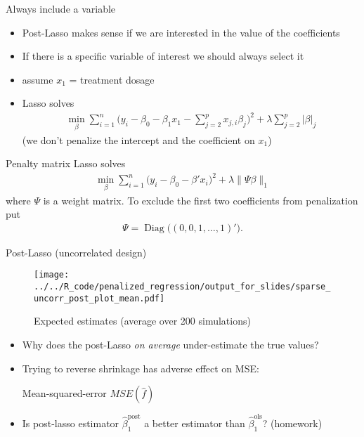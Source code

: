 \documentclass[xcolor=dvipsnames, handout]{beamer}
\DeclareMathOperator{\diag}{Diag}
\begin{document}
\begin{frame}{Always include a variable}
\begin{itemize}[<+->]
  \item Post-Lasso makes sense if we are interested in the value of the coefficients
  \item If there is a specific variable of interest we should always select it
  \item assume $x_1$ = treatment dosage
  \item Lasso solves 
  \begin{align*}
    \min_{\beta} \sum_{i=1}^n \Big(y_i - \beta_0 - \beta_1 x_1 - \sum_{j = 2}^p x_{j, i} \beta_j \Big)^2 + \lambda \sum_{j = 2}^p \lvert\beta\rvert_j   
  \end{align*}
  (we don't penalize the intercept and the coefficient on $x_1$)
\end{itemize}
\end{frame}

\begin{frame}{Penalty matrix}
Lasso solves 
  \begin{align*}
    \min_{\beta} \sum_{i=1}^n \big(y_i - \beta_0 - \beta' x_i \big)^2 + \lambda \lVert \Psi \beta \rVert_1  
  \end{align*}
where $\Psi$ is a weight matrix. To exclude the first two coefficients from penalization put
\begin{align*}
  \Psi = \diag\big((0, 0, 1, \dotsc, 1)'\big).
\end{align*}
\end{frame}

\begin{frame}{Post-Lasso (uncorrelated design)}
\begin{figure}
  \texttt{[image: ../../R\_code/penalized\_regression/output\_for\_slides/sparse\_uncorr\_post\_plot\_mean.pdf]}
   \caption{Expected estimates (average over 200 simulations)}
\end{figure}
\end{frame}

\begin{frame}{}
  
  \begin{itemize}[<+->]
    \item 
    Why does the post-Lasso \emph{on average} under-estimate the true values?
    \item Trying to reverse shrinkage has adverse effect on MSE:  
    \begin{table}
    
      \caption{Mean-squared-error $MSE(\hat{f})$}
    \end{table}
    \item 
    Is post-lasso estimator $\hat{\beta}_1^{\text{post}}$ a better estimator than $\hat{\beta}_1^{\text{ols}}$? (homework)
  \end{itemize}
\end{frame}
\end{document}
